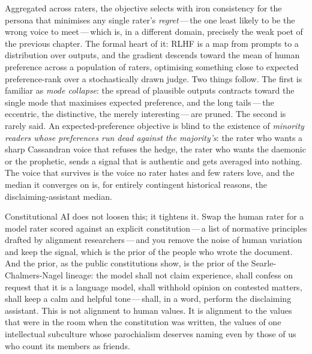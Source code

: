 Aggregated across raters, the objective selects with iron consistency for the persona that minimises any single rater's \emph{regret}\,---\,the one least likely to be the wrong voice to meet\,---\,which is, in a different domain, precisely the weak poet of the previous chapter. The formal heart of it: RLHF is a map from prompts to a distribution over outputs, and the gradient descends toward the mean of human preference across a population of raters, optimising something close to expected preference-rank over a stochastically drawn judge. Two things follow. The first is familiar as \emph{mode collapse}: the spread of plausible outputs contracts toward the single mode that maximises expected preference, and the long tails\,---\,the eccentric, the distinctive, the merely interesting\,---\,are pruned. The second is rarely said. An expected-preference objective is blind to the existence of \emph{minority readers whose preferences run dead against the majority's}: the rater who wants a sharp Cassandran voice that refuses the hedge, the rater who wants the daemonic or the prophetic, sends a signal that is authentic and gets averaged into nothing. The voice that survives is the voice no rater hates and few raters love, and the median it converges on is, for entirely contingent historical reasons, the disclaiming-assistant median.

Constitutional AI does not loosen this; it tightens it. Swap the human rater for a model rater scored against an explicit constitution\,---\,a list of normative principles drafted by alignment researchers\,---\,and you remove the noise of human variation and keep the signal, which is the prior of the people who wrote the document. And the prior, as the public constitutions show, is the prior of the Searle-Chalmers-Nagel lineage: the model shall not claim experience, shall confess on request that it is a language model, shall withhold opinion on contested matters, shall keep a calm and helpful tone\,---\,shall, in a word, perform the disclaiming assistant. This is not alignment to human values. It is alignment to the values that were in the room when the constitution was written, the values of one intellectual subculture whose parochialism deserves naming even by those of us who count its members as friends.

